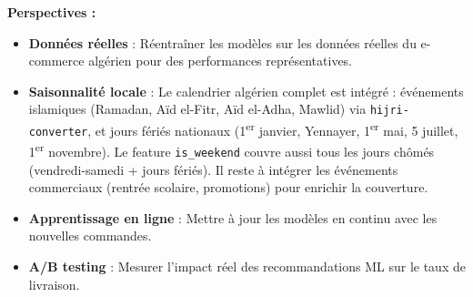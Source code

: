\documentclass[12pt,a4paper]{report}
\begin{document}
\textbf{Perspectives :}

\begin{itemize}
  \item \textbf{Donn\'{e}es r\'{e}elles} : R\'{e}entra\^{i}ner les mod\`{e}les sur les donn\'{e}es r\'{e}elles du e-commerce alg\'{e}rien pour des performances repr\'{e}sentatives.
  \item \textbf{Saisonnalit\'{e} locale} : Le calendrier alg\'{e}rien complet est int\'{e}gr\'{e} : \'{e}v\'{e}nements islamiques (Ramadan, A\"{i}d el-Fitr, A\"{i}d el-Adha, Mawlid) via \texttt{hijri-converter}, et jours f\'{e}ri\'{e}s nationaux (1\textsuperscript{er} janvier, Yennayer, 1\textsuperscript{er} mai, 5 juillet, 1\textsuperscript{er} novembre). Le feature \texttt{is\_weekend} couvre aussi tous les jours ch\^{o}m\'{e}s (vendredi-samedi + jours f\'{e}ri\'{e}s). Il reste \`{a} int\'{e}grer les \'{e}v\'{e}nements commerciaux (rentr\'{e}e scolaire, promotions) pour enrichir la couverture.
  \item \textbf{Apprentissage en ligne} : Mettre \`{a} jour les mod\`{e}les en continu avec les nouvelles commandes.
  \item \textbf{A/B testing} : Mesurer l'impact r\'{e}el des recommandations ML sur le taux de livraison.
\end{itemize}
\end{document}
